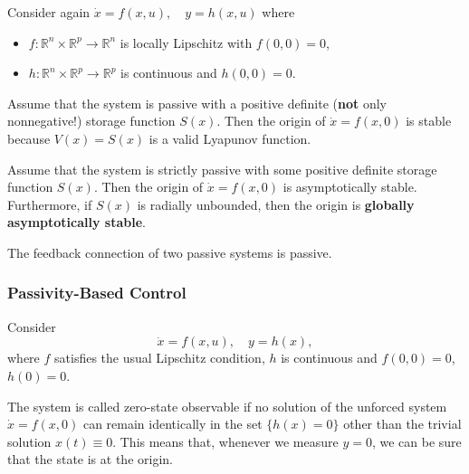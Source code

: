 Consider again $\dot{x} = f(x, u), \quad y = h(x, u)$ where
\begin{itemize}
    \item $f : \mathbb{R}^n \times \mathbb{R}^p \to \mathbb{R}^n$ is locally Lipschitz with $f(0, 0) = 0$,
    \item $h : \mathbb{R}^n \times \mathbb{R}^p \to \mathbb{R}^p$ is continuous and $h(0, 0) = 0$.
\end{itemize}

\newpar{}

Assume that the system is passive with a positive definite (\textbf{not} only nonnegative!) storage function $S(x)$.
\newpar{}
Then the origin of $\dot{x} = f(x, 0)$ is stable because $V(x) = S(x)$ is a valid Lyapunov function.

\newpar{}

Assume that the system is strictly passive with some positive definite storage function $S(x)$. %
\newpar{}
Then the origin of $\dot{x} = f(x, 0)$ is asymptotically stable.
\newpar{}
Furthermore, if $S(x)$ is radially unbounded, then the origin is \textbf{globally asymptotically stable}.

\newpar{}

The feedback connection of two passive systems is passive.

\subsubsection{Passivity-Based Control}
Consider
\begin{equation*}
    \dot{x} = f(x, u), \quad y = h(x),
\end{equation*}
where $f$ satisfies the usual Lipschitz condition, $h$ is continuous and $f(0, 0) = 0$, $h(0) = 0$.

\newpar{}

The system is called zero-state observable if no solution of the unforced system $\dot{x} = f(x, 0)$ can remain identically in the set $\{h(x) = 0\}$ other than the trivial solution $x(t) \equiv 0$.
\newpar{}
This means that, whenever we measure $y=0$, we can be sure that the state is at the origin.

\newpar{}

